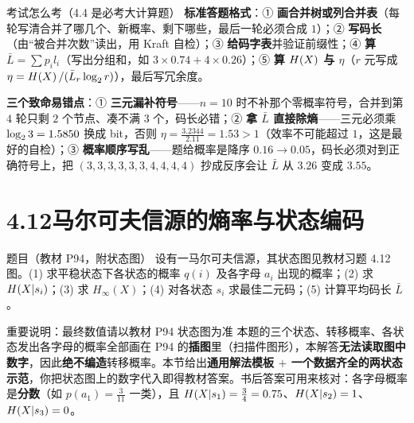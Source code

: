 \documentclass[11pt,a4paper]{ctexart}
\begin{document}
\begin{exam}{考试怎么考（4.4 是必考大计算题）}
\textbf{标准答题格式}：① \textbf{画合并树或列合并表}（每轮写清合并了哪几个、新概率、剩下哪些，最后一轮必须合成 $1$）；② \textbf{写码长}（由“被合并次数”读出，用 Kraft 自检）；③ \textbf{给码字表}并验证前缀性；④ \textbf{算 $\bar L=\sum p_il_i$}（写出分组和，如 $3\times0.74+4\times0.26$）；⑤ \textbf{算 $H\!\left(X\right)$ 与 $\eta$}（$r$ 元写成 $\eta=H\!\left(X\right)/(\bar L_r\log_{2} r)$），最后写冗余度。

\textbf{三个致命易错点}：① \textbf{三元漏补符号}——$n=10$ 时不补那个零概率符号，合并到第 $4$ 轮只剩 $2$ 个节点、凑不满 $3$ 个，码长必错；② \textbf{拿 $\bar L$ 直接除熵}——三元必须乘 $\log_{2}3=1.5850$ 换成 bit，否则 $\eta=\frac{3.2344}{2.11}=1.53>1$（效率不可能超过 $1$，这是最好的自检）；③ \textbf{概率顺序写乱}——题给概率是降序 $0.16\to0.05$，码长必须对到正确符号上，把 $(3,3,3,3,3,3,4,4,4,4)$ 抄成反序会让 $\bar L$ 从 $3.26$ 变成 $3.55$。
\end{exam}

\section{4.12\quad 马尔可夫信源的熵率与状态编码}

\begin{defbox}{题目（教材 P94，附状态图）}
设有一马尔可夫信源，其状态图见教材习题 4.12 图。(1) 求平稳状态下各状态的概率 $q(i)$ 及各字母 $a_i$ 出现的概率；(2) 求 $H\!\left(X|s_i\right)$；(3) 求 $H_\infty(X)$；(4) 对各状态 $s_i$ 求最佳二元码；(5) 计算平均码长 $\bar L$。
\end{defbox}

\begin{qa}{重要说明：最终数值请以教材 P94 状态图为准}
本题的三个状态、转移概率、各状态发出各字母的概率全部画在 P94 的\textbf{插图}里（扫描件图形），本解答\textbf{无法读取图中数字}，因此\textbf{绝不编造}转移概率。本节给出\textbf{通用解法模板 $+$ 一个数据齐全的两状态示范}，你把状态图上的数字代入即得教材答案。书后答案可用来核对：各字母概率是\textbf{分数}（如 $p(a_1)=\frac3{11}$ 一类），且 $H\!\left(X|s_1\right)=\frac34=0.75$、$H\!\left(X|s_2\right)=1$、$H\!\left(X|s_3\right)=0$。
\end{qa}
\end{document}
